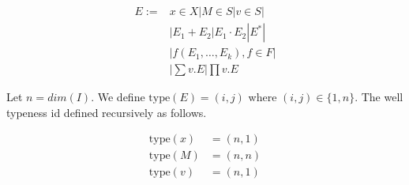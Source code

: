 \begin{align*}
E:=& x\in X | M\in S | v\in S | \\
&|E_1+E_2 | E_1\cdot E_2 | E^* | \\
& |f(E_1,\ldots, E_k), f\in F | \\
& |\sum v. E | \prod v. E
\end{align*}

Let $n=dim(I)$. We define $\text{type}(E)=(i,j)$ where $(i,j)\in \lbrace 1, n\rbrace$. The well typeness id defined recursively as follows.

\begin{align*}
\text{type}(x) &= (n,1) \\
\text{type}(M) &= (n,n) \\
\text{type}(v) &= (n,1) 
\end{align*}


